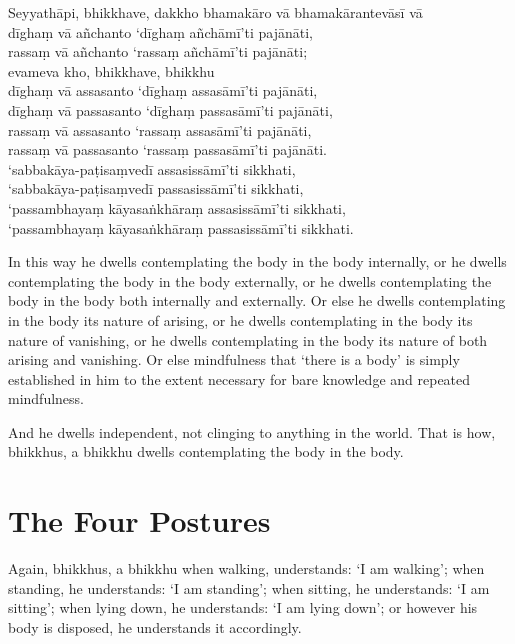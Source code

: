 \enlargethispage{\baselineskip}

Seyyathāpi, bhikkhave, dakkho bhamakāro vā bhamakārantevāsī vā\\
dīghaṃ vā añchanto ‘dīghaṃ añchāmī’ti pajānāti,\\
rassaṃ vā añchanto ‘rassaṃ añchāmī’ti pajānāti;\\
evameva kho, bhikkhave, bhikkhu\\
dīghaṃ vā assasanto ‘dīghaṃ assasāmī’ti pajānāti,\\
dīghaṃ vā passasanto ‘dīghaṃ passasāmī’ti pajānāti,\\
rassaṃ vā assasanto ‘rassaṃ assasāmī’ti pajānāti,\\
rassaṃ vā passasanto ‘rassaṃ passasāmī’ti pajānāti.\\
‘sabbakāya-paṭisaṃvedī assasissāmī’ti sikkhati,\\
‘sabbakāya-paṭisaṃvedī passasissāmī’ti sikkhati,\\
‘passambhayaṃ kāyasaṅkhāraṃ assasissāmī’ti sikkhati,\\
‘passambhayaṃ kāyasaṅkhāraṃ passasissāmī’ti sikkhati.

\englishPage

In this way he dwells contemplating the body in the body internally, or he
dwells contemplating the body in the body externally, or he dwells contemplating
the body in the body both internally and externally. Or else he dwells
contemplating in the body its nature of arising, or he dwells contemplating in
the body its nature of vanishing, or he dwells contemplating in the body its
nature of both arising and vanishing. Or else mindfulness that ‘there is a body’
is simply established in him to the extent necessary for bare knowledge and
repeated mindfulness.

And he dwells independent, not clinging to anything in the world. That is how,
bhikkhus, a bhikkhu dwells contemplating the body in the body.


\section{The Four Postures}

Again, bhikkhus, a bhikkhu when walking, understands: ‘I am walking’; when
standing, he understands: ‘I am standing’; when sitting, he understands: ‘I am
sitting’; when lying down, he understands: ‘I am lying down’; or however his
body is disposed, he understands it accordingly.

